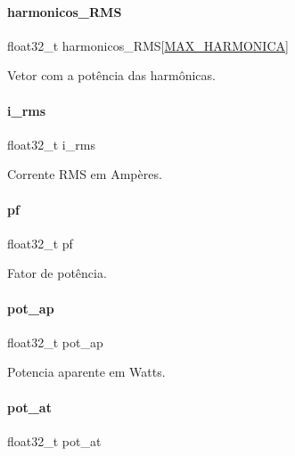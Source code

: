 \paragraph{\texorpdfstring{harmonicos\+\_\+\+R\+MS}{harmonicos\_RMS}}
{\footnotesize\ttfamily float32\+\_\+t harmonicos\+\_\+\+R\+MS\mbox{[}\hyperlink{defines_8h_a21e24b95b94f5365ae4b50fc716a838d}{M\+A\+X\+\_\+\+H\+A\+R\+M\+O\+N\+I\+CA}\mbox{]}}

Vetor com a potência das harmônicas. \mbox{\label{struct_parametros_a66cc01ebf95eb4de14f446a51fc6ed78}} 
\paragraph{\texorpdfstring{i\+\_\+rms}{i\_rms}}
{\footnotesize\ttfamily float32\+\_\+t i\+\_\+rms}

Corrente R\+MS em Ampères. \mbox{\label{struct_parametros_ac868390d99feaa32f9472b70a1074749}} 
\paragraph{\texorpdfstring{pf}{pf}}
{\footnotesize\ttfamily float32\+\_\+t pf}

Fator de potência. \mbox{\label{struct_parametros_a08c522040c18468c41e5c674b1327464}} 
\paragraph{\texorpdfstring{pot\+\_\+ap}{pot\_ap}}
{\footnotesize\ttfamily float32\+\_\+t pot\+\_\+ap}

Potencia aparente em Watts. \mbox{\label{struct_parametros_a2aa10811f3673de8c32edb10c1be6f4c}} 
\paragraph{\texorpdfstring{pot\+\_\+at}{pot\_at}}
{\footnotesize\ttfamily float32\+\_\+t pot\+\_\+at}

